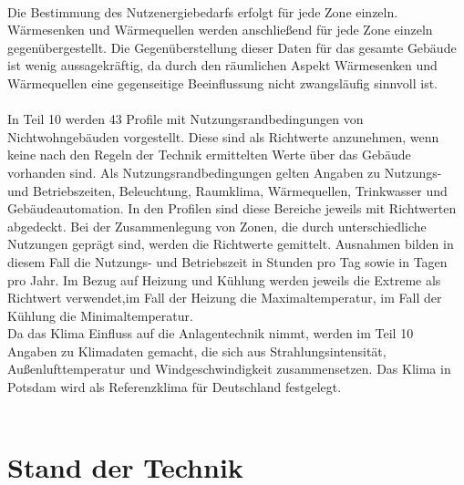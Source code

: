\\
Die Bestimmung des Nutzenergiebedarfs erfolgt für jede Zone einzeln. Wärmesenken und Wärmequellen werden anschließend für jede Zone einzeln gegenübergestellt. Die Gegenüberstellung dieser Daten für das gesamte Gebäude ist wenig aussagekräftig, da durch den räumlichen Aspekt Wärmesenken und Wärmequellen eine gegenseitige Beeinflussung nicht zwangsläufig sinnvoll ist.\\
\\
In Teil 10 werden 43 Profile mit Nutzungsrandbedingungen von Nichtwohngebäuden vorgestellt. Diese sind als Richtwerte anzunehmen, wenn keine nach den Regeln der Technik ermittelten Werte über das Gebäude vorhanden sind. Als Nutzungsrandbedingungen gelten Angaben zu Nutzungs- und Betriebszeiten, Beleuchtung, Raumklima, Wärmequellen, Trinkwasser und Gebäudeautomation. In den Profilen sind diese Bereiche jeweils mit Richtwerten abgedeckt. 
Bei der Zusammenlegung von Zonen, die durch unterschiedliche Nutzungen geprägt sind, werden die Richtwerte gemittelt. Ausnahmen bilden in diesem Fall die Nutzungs- und Betriebszeit in Stunden pro Tag sowie in Tagen pro Jahr. Im Bezug auf Heizung und Kühlung werden jeweils die Extreme als Richtwert verwendet,im Fall der Heizung die Maximaltemperatur, im Fall der Kühlung die Minimaltemperatur.  \\
Da das Klima Einfluss auf die Anlagentechnik nimmt, werden im Teil 10 Angaben zu Klimadaten gemacht, die sich aus Strahlungsintensität, Außenlufttemperatur und Windgeschwindigkeit zusammensetzen. Das Klima in Potsdam wird als Referenzklima für Deutschland festgelegt.\\
\\

\chapter{Stand der Technik}
\label{cha:Stand der Technik}

